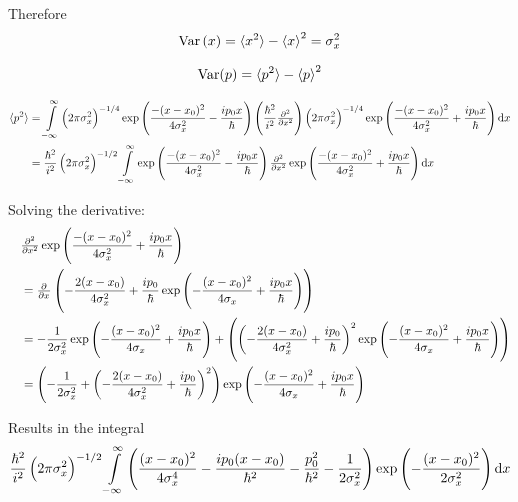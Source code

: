 \documentclass[a4paper,german,12pt,smallheadings]{scrartcl}
\DeclareMathOperator{\Var}{Var}
\begin{document}
\begin{enumerate}[a)]
    Therefore
    \begin{align*}
      \Var\del{x} = \braket{x^2} - \braket{x}^2 = \sigma_x^2
    \end{align*}

    \begin{align*}
      \Var(p) = \braket{p^2} - \braket{p}^2
    \end{align*}

    \begin{align*}
      \braket{p^2} &= 
        \int\limits_{-\infty}^\infty
        \del{2 \pi \sigma_x^2}^{-1/4} \exp\del{\frac{-(x-x_0)^2}{4 \sigma_x^2} - \frac{ip_0x}{\hbar}}
        \del{\frac{\hbar^2}{i^2} \pd[2]{}{x}}
        \del{2 \pi \sigma_x^2}^{-1/4} \exp\del{\frac{-(x-x_0)^2}{4 \sigma_x^2} + \frac{ip_0x}{\hbar}}
        \dif x \\
        &= \frac{\hbar^2}{i^2} \del{2 \pi \sigma_x^2}^{-1/2} \int\limits_{-\infty}^\infty
        \exp\del{\frac{-(x-x_0)^2}{4 \sigma_x^2} - \frac{ip_0x}{\hbar}}
        \pd[2]{}{x}
        \exp\del{\frac{-(x-x_0)^2}{4 \sigma_x^2} + \frac{ip_0x}{\hbar}}
        \dif x \\
    \end{align*}

    Solving the derivative:
    \begin{align*}
      \quad&\pd[2]{}{x} \exp\del{\frac{-(x-x_0)^2}{4 \sigma_x^2} + \frac{ip_0x}{\hbar}} \\
      &= \pd{}{x} \del{-\frac{2(x-x_0)}{4\sigma_x^2} + \frac{ip_0}{\hbar} \exp\del{-\frac{(x-x_0)^2}{4\sigma_x} + \frac{ip_0x}{\hbar}}} \\
      &= -\frac{1}{2 \sigma_x^2} \exp\del{-\frac{(x-x_0)^2}{4\sigma_x} + \frac{ip_0x}{\hbar}} +
      \del{\del{-\frac{2(x-x_0)}{4\sigma_x^2} + \frac{ip_0}{\hbar}}^2 \exp\del{-\frac{(x-x_0)^2}{4\sigma_x} + \frac{ip_0x}{\hbar}}} \\
      &= \del{-\frac{1}{2 \sigma_x^2} +
      \del{-\frac{2(x-x_0)}{4\sigma_x^2} + \frac{ip_0}{\hbar}}^2} 
      \exp\del{-\frac{(x-x_0)^2}{4\sigma_x} + \frac{ip_0x}{\hbar}}
    \end{align*}

    Results in the integral
    \begin{align*}
      \frac{\hbar^2}{i^2} \del{2 \pi \sigma_x^2}^{-1/2} \int\limits_{-\infty}^\infty 
      \del{\frac{(x-x_0)^2}{4\sigma_x^4} - \frac{ip_0(x-x_0)}{\hbar^2} - \frac{p_0^2}{\hbar^2} - \frac{1}{2\sigma_x^2}}
      \exp\del{-\frac{(x-x_0)^2}{2\sigma_x^2}} \dif x
    \end{align*}


\end{enumerate}
\end{document}

